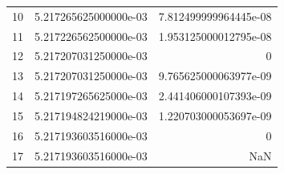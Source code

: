 \documentclass[aspectratio=1610]{beamer}
\begin{document}
\begin{frame}
\begin{columns}
{\begin{tabular}{|r|c|r|}
     10 &     5.217265625000000e-03 &    7.812499999964445e-08\\
     11 &     5.217226562500000e-03 &    1.953125000012795e-08\\
     12 &     5.217207031250000e-03 &                        0\\
     13 &     5.217207031250000e-03 &    9.765625000063977e-09\\
     14 &     5.217197265625000e-03 &    2.441406000107393e-09\\
     15 &     5.217194824219000e-03 &    1.220703000053697e-09\\
     16 &     5.217193603516000e-03 &                        0\\
     17 &     5.217193603516000e-03 &                      NaN\\ \hline
     	\end{tabular}}	
\end{columns} 
\end{frame}
\end{document}
